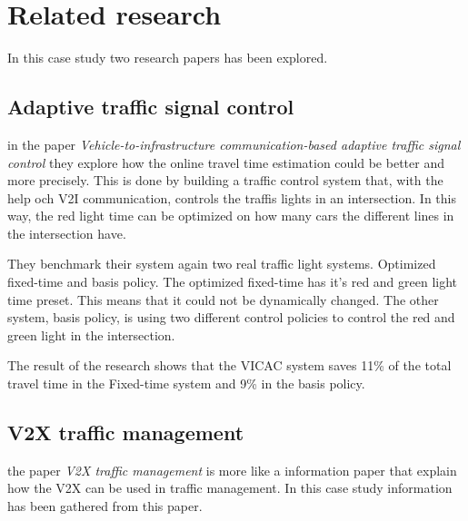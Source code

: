 \section{Related research}
In this case study two research papers has been explored.

\subsection{Adaptive traffic signal control}
in the paper \textit{Vehicle-to-infrastructure communication-based adaptive traffic signal control} \cite{vicacPaper} they explore how the online travel time estimation could be better and more precisely. This is done by building a traffic control system that, with the help och V2I communication, controls the traffis lights in an intersection. In this way, the red light time can be optimized on how many cars the different lines in the intersection have.\cite{vicacPaper}

\bigskip

They benchmark their system again two real traffic light systems. Optimized fixed-time and basis policy. The optimized fixed-time has it's red and green light time preset. This means that it could not be dynamically changed. The other system, basis policy, is using two different control policies to control the red and green light in the intersection.\cite{vicacPaper}

\bigskip

The result of the research shows that the VICAC system saves 11\% of the total travel time in the Fixed-time system and 9\% in the basis policy.\cite{vicacPaper}

\subsection{V2X traffic management}
the paper \textit{V2X traffic management} \cite{v2xPaper} is more like a information paper that explain how the V2X can be used in traffic management. In this case study information has been gathered from this paper.
